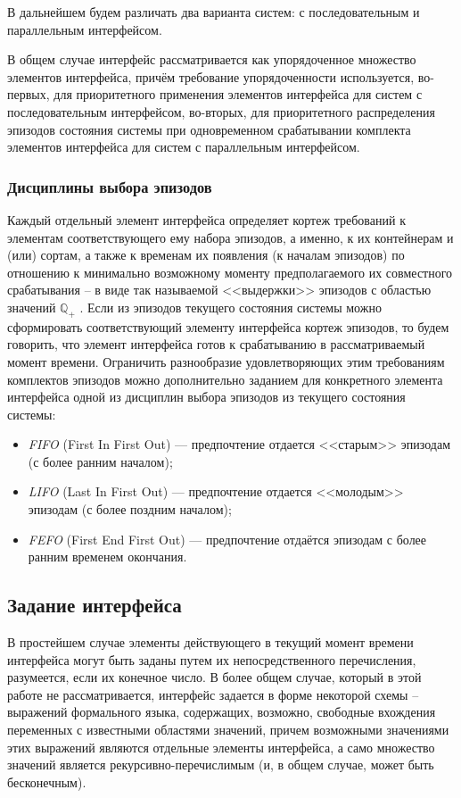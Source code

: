 В дальнейшем будем различать два варианта систем: с последовательным и параллельным интерфейсом.

В общем случае интерфейс рассматривается как упорядоченное множество элементов интерфейса, причём требование упорядоченности используется, во-первых, для приоритетного применения элементов интерфейса для систем с последовательным интерфейсом, во-вторых, для приоритетного распределения эпизодов состояния системы при одновременном срабатывании комплекта элементов интерфейса для систем с параллельным интерфейсом.

\subsubsection{Дисциплины выбора эпизодов}
Каждый отдельный элемент интерфейса определяет кортеж требований к элементам соответствующего ему набора эпизодов, а именно, к их контейнерам и (или) сортам, а также к временам их появления (к началам эпизодов) по отношению к минимально возможному моменту предполагаемого их совместного срабатывания – в виде так называемой <<выдержки>> эпизодов с областью значений $ \mathbb{Q}_+ $ . 
Если из эпизодов текущего состояния системы можно сформировать соответствующий элементу интерфейса кортеж эпизодов, то будем говорить, что элемент интерфейса готов к срабатыванию в рассматриваемый момент времени. 
Ограничить разнообразие удовлетворяющих этим требованиям комплектов эпизодов можно дополнительно заданием для конкретного элемента интерфейса одной из дисциплин выбора эпизодов из текущего состояния системы: 
\begin{itemize}
	\item \textit{FIFO} (First In First Out) --- предпочтение отдается <<старым>> эпизодам (с более ранним началом);
	\item \textit{LIFO} (Last In First Out) --- предпочтение отдается <<молодым>> эпизодам (с более поздним началом);
	\item \textit{FEFO} (First End First Out) --- предпочтение отдаётся эпизодам с более ранним временем окончания.
\end{itemize} 

\subsection{Задание интерфейса}

В простейшем случае элементы действующего в текущий момент времени интерфейса могут быть заданы путем их непосредственного перечисления, разумеется, если их конечное число.
В более общем случае, который в этой работе не рассматривается, интерфейс задается в форме некоторой схемы – выражений формального языка, содержащих, возможно, свободные вхождения переменных с известными областями значений, причем возможными значениями этих выражений являются отдельные элементы интерфейса, а само множество значений является рекурсивно-перечислимым (и, в общем случае, может быть бесконечным). 

